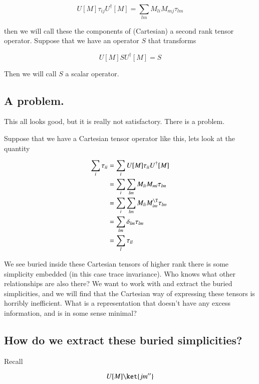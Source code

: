 \begin{equation}\label{eqn:qmTwoL19:190}
U[M] \tau_{ij} U^\dagger[M] = \sum_{lm} M_{li} M_{mj} \tau_{lm}
\end{equation}

then we will call these the components of (Cartesian) a second rank tensor operator.  Suppose that we have an operator $S$ that transforms

\begin{equation}\label{eqn:qmTwoL19:210}
U[M] S U^\dagger[M] = S
\end{equation}

Then we will call $S$ a scalar operator.

\subsection{A problem.}

This all looks good, but it is really not satisfactory.  There is a problem.

Suppose that we have a Cartesian tensor operator like this, lets look at the quantity

\begin{align*}
\sum_i \tau_{ii}
&=
\sum_i
U[M] \tau_{ii} U^\dagger[M]  \\
&= 
\sum_i
\sum_{lm} M_{li} M_{mi} \tau_{lm} 
\\
&= 
\sum_i
\sum_{lm} M_{li} M_{im}^\T \tau_{lm} 
\\
&= 
\sum_{lm} \delta_{lm} \tau_{lm} 
\\
&= 
\sum_{l} \tau_{ll} 
\end{align*}

We see buried inside these Cartesian tensors of higher rank there is some simplicity embedded (in this case trace invariance).  Who knows what other relationships are also there?  We want to work with and extract the buried simplicities, and we will find that the Cartesian way of expressing these tensors is horribly inefficient.  What is a representation that doesn't have any excess information, and is in some sense minimal?

\subsection{How do we extract these buried simplicities?}

Recall 

\begin{equation}\label{eqn:qmTwoL19:230}
U[M] \ket{j m''} 
\end{equation}

